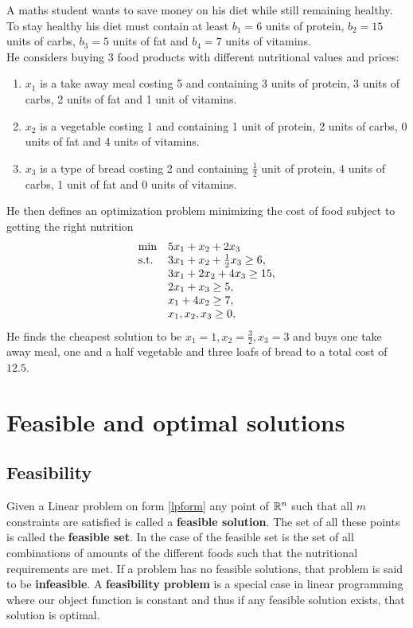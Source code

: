 \begin{example}\label{lpex}
A maths student wants to save money on his diet while still remaining healthy. To stay healthy his diet must contain at least $b_1=6$ units of protein, $b_2=15$ units of carbs, $b_3=5$ units of fat and $b_4=7$ units of vitamins.\\
He considers buying 3 food products with different nutritional values and prices: 
\begin{enumerate}
\item $x_1$ is a take away meal costing 5 and containing 3 units of protein, 3 units of carbs, 2 units of fat and 1 unit of vitamins.
\item $x_2$ is a vegetable costing 1 and containing 1 unit of protein, 2 units of carbs, 0 units of fat and 4 units of vitamins.
\item $x_3$ is a type of bread costing 2 and containing $\frac{1}{2}$ unit of protein, 4 units of carbs, 1 unit of fat and 0 units of vitamins.
\end{enumerate}
He then defines an optimization problem minimizing the cost of food subject to getting the right nutrition
\begin{align}
\begin{array}{ll@{}ll}
\text{min} &5x_1+x_2+2x_3&\\
\text{s.t.} &3x_1+x_2+\frac{1}{2}x_3 \geq 6,&\\
&3x_1+2x_2+4x_3 \geq 15,&\\
&2x_1+x_3 \geq 5,&\\
&x_1+4x_2 \geq 7,&\\
&x_1,x_2,x_3 \geq 0,&\\
\end{array}
\end{align}
He finds the cheapest solution to be $x_1 = 1, x_2= \frac{3}{2},x_3 = 3$ and buys one take away meal, one and a half vegetable and three loafs of bread to a total cost of $12.5$.
\end{example}
\section{Feasible and optimal solutions}
\subsection{Feasibility}
Given a Linear problem on form \ref{lpform} any point of $\mathbb{R}^n$ such that all $m$ constraints are satisfied is called a \textbf{feasible solution}. The set of all these points is called the \textbf{feasible set}. In the case of  the feasible set is the set of all combinations of amounts of the different foods such that the nutritional requirements are met. If a problem has no feasible solutions, that problem is said to be \textbf{infeasible}. A \textbf{feasibility problem} is a special case in linear programming where our object function is constant and thus if any feasible solution exists, that solution is optimal.
